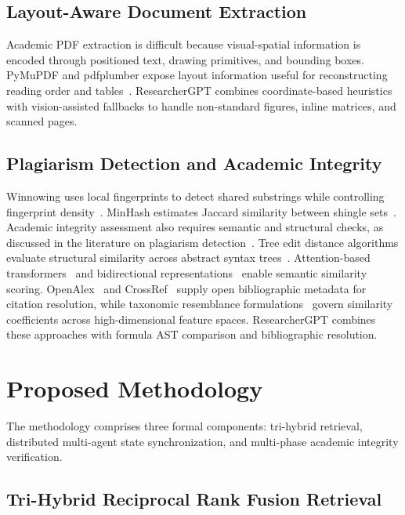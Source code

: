 \documentclass[conference]{IEEEtran}
\begin{document}
\subsection{Layout-Aware Document Extraction}
Academic PDF extraction is difficult because visual-spatial information is encoded through positioned text, drawing primitives, and bounding boxes. PyMuPDF and pdfplumber expose layout information useful for reconstructing reading order and tables~\cite{singer2023pdfplumber}. ResearcherGPT combines coordinate-based heuristics with vision-assisted fallbacks to handle non-standard figures, inline matrices, and scanned pages.

\subsection{Plagiarism Detection and Academic Integrity}
Winnowing uses local fingerprints to detect shared substrings while controlling fingerprint density~\cite{schleimer2003winnowing}. MinHash estimates Jaccard similarity between shingle sets~\cite{broder1997resemblance}. Academic integrity assessment also requires semantic and structural checks, as discussed in the literature on plagiarism detection~\cite{foltynek2019plagiarism}. Tree edit distance algorithms evaluate structural similarity across abstract syntax trees~\cite{zhang1989tree}. Attention-based transformers~\cite{vaswani2017attention} and bidirectional representations~\cite{devlin2019bert} enable semantic similarity scoring. OpenAlex~\cite{priem2022openalex} and CrossRef~\cite{hendricks2020crossref} supply open bibliographic metadata for citation resolution, while taxonomic resemblance formulations~\cite{sneath1973taxonomy} govern similarity coefficients across high-dimensional feature spaces. ResearcherGPT combines these approaches with formula AST comparison and bibliographic resolution.

\section{Proposed Methodology}
The methodology comprises three formal components: tri-hybrid retrieval, distributed multi-agent state synchronization, and multi-phase academic integrity verification.

\subsection{Tri-Hybrid Reciprocal Rank Fusion Retrieval}
\end{document}
